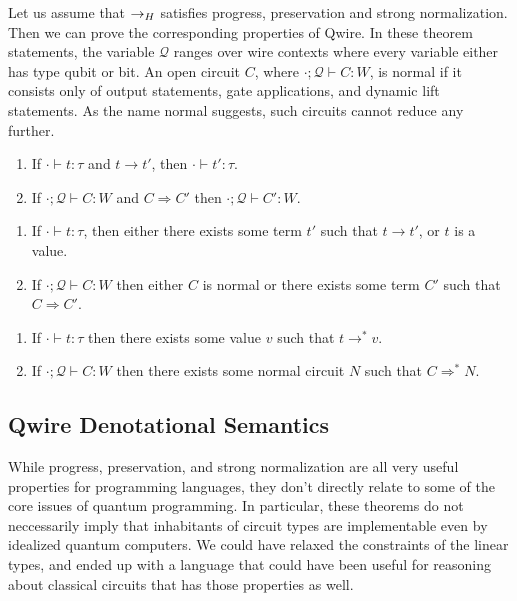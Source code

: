 Let us assume that $\rightarrow_{H}$ satisfies progress, preservation and strong normalization.
Then we can prove the corresponding properties of Qwire.
In these theorem statements, the variable $\mathscr{Q}$ ranges over wire contexts where every variable either has type qubit or bit.
An open circuit $C$, where $\cdot;\mathscr{Q}\vdash C : W$, is normal if it consists only of output statements, gate applications, and dynamic lift statements.
As the name normal suggests, such circuits cannot reduce any further.

\begin{theorem}[Preservation]
\thmbegin
\begin{enumerate}
    \item If $\cdot \vdash t : \tau$ and $t \rightarrow t'$, then $\cdot \vdash t' : \tau$.
    \item If $\cdot; \mathscr{Q}\vdash C : W$ and $C \Rightarrow C'$ then $\cdot; \mathscr{Q}\vdash C' : W$.
\end{enumerate}
\end{theorem}

\begin{theorem}[Progress]
\thmbegin
\begin{enumerate}
    \item If $\cdot \vdash t : \tau$, then either there exists some term $t'$ such that $t \rightarrow t'$, or $t$ is a value.
    \item If $\cdot;\mathscr{Q}\vdash C : W$ then either $C$ is normal or there exists some term $C'$ such that $C \Rightarrow C'$.
\end{enumerate}
\end{theorem}

\begin{theorem}
\thmbegin
\begin{enumerate}
    \item If $\cdot \vdash t : \tau$ then there exists some value $v$ such that $t \rightarrow^* v$.
    \item If $\cdot; \mathscr{Q}\vdash C : W$ then there exists some normal circuit $N$ such that $C \Rightarrow^* N$.
\end{enumerate}
\end{theorem}
\subsection{Qwire Denotational Semantics}
While progress, preservation, and strong normalization are all very useful properties for programming languages, they don't directly relate to some of the core issues of quantum programming.
In particular, these theorems do not neccessarily imply that inhabitants of circuit types are implementable even by idealized quantum computers.
We could have relaxed the constraints of the linear types, and ended up with a language that could have been useful for reasoning about classical circuits that has those properties as well.

